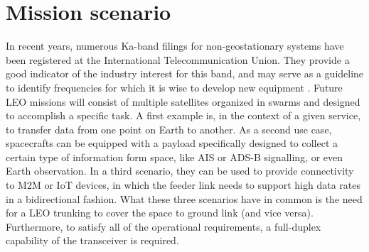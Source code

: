 \documentclass[conference,10pt,a4paper]{IEEEtran}%
\begin{document}
\section{Mission scenario}
\label{sec:mis-sce}
In recent years, numerous Ka-band filings for non-geostationary systems have been registered at the International Telecommunication Union.
They provide a good indicator of the industry interest for this band, and may serve as a guideline to identify frequencies for which it is wise to develop new equipment \cite{ioag2016}.
Future LEO missions will consist of multiple satellites organized in swarms and designed to accomplish a specific task.
A first example is, in the context of a given service, to transfer data from one point on Earth to another.
As a second use case, spacecrafts can be equipped with a payload specifically designed to collect a certain type of information form space, like AIS or ADS-B signalling, or even Earth observation.
In a third scenario, they can be used to provide connectivity to M2M or IoT devices, in which the feeder link needs to support high data rates in a bidirectional fashion.
What these three scenarios have in common is the need for a LEO trunking to cover the space to ground link (and vice versa).
Furthermore, to satisfy all of the operational requirements, a full-duplex capability of the transceiver is required.
\end{document}
